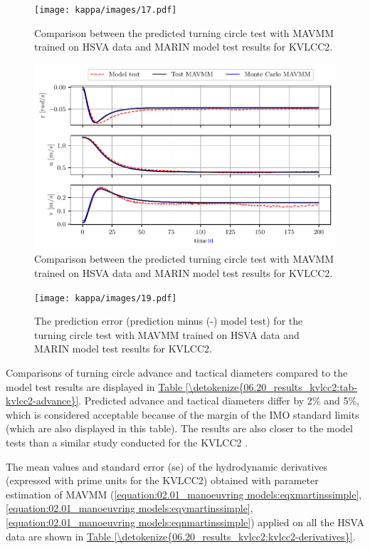 \begin{figure}[h!]
\centering
\texttt{[image: kappa/images/17.pdf]}
\caption{Comparison between the predicted turning circle test with MAVMM trained on HSVA data and MARIN model test results for KVLCC2.}\label{\detokenize{06.20_results_kvlcc2:fig-kvlcc2-track-plot-testing-sim}}\end{figure}
\begin{figure}[h!]
\centering
\includegraphics[width=1.0\textwidth]{kappa/images/18.pdf}
\caption{Comparison between the predicted turning circle test with MAVMM trained on HSVA data and MARIN model test results for KVLCC2.}\label{\detokenize{06.20_results_kvlcc2:fig-kvlcc2-testing-sim}}\end{figure}
\begin{figure}[h!]
\centering
\texttt{[image: kappa/images/19.pdf]}
\caption{The prediction error (prediction minus (-) model test) for the turning circle test with MAVMM trained on HSVA data and MARIN model test results for KVLCC2.}\label{\detokenize{06.20_results_kvlcc2:fig-kvlcc2-testing-sim-error}}\end{figure} 

Comparisons of turning circle advance and tactical diameters compared to the model test results are displayed in \hyperref[\detokenize{06.20_results_kvlcc2:tab-kvlcc2-advance}]{Table \ref{\detokenize{06.20_results_kvlcc2:tab-kvlcc2-advance}}}. Predicted advance and tactical diameters differ by 2\% and 5\%, which is considered acceptable because of the margin of the IMO standard limits (which are also displayed in this table). The results are also closer to the model tests than a similar study conducted for the KVLCC2 \cite{heNonparametricModelingShip2022}.

\clearpage
The mean values and standard error (se) of the hydrodynamic derivatives (expressed with prime units for the KVLCC2) obtained with parameter estimation of MAVMM (\autoref{equation:02.01_manoeuvring models:eqxmartinssimple}, \autoref{equation:02.01_manoeuvring models:eqymartinssimple}, \autoref{equation:02.01_manoeuvring models:eqnmartinssimple}) applied on all the HSVA data are shown in \hyperref[\detokenize{06.20_results_kvlcc2:kvlcc2-derivatives}]{Table \ref{\detokenize{06.20_results_kvlcc2:kvlcc2-derivatives}}}.

